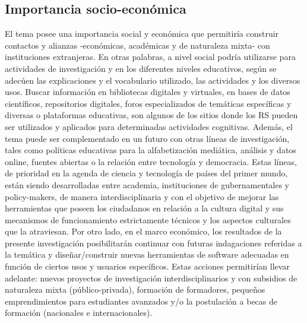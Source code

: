 \subsection{Importancia socio-económica}
\noindent El tema posee una importancia social y económica que permitiría construir contactos y alianzas -económicas, académicas y de naturaleza mixta- con instituciones extranjeras. En otras palabras, a nivel social podría utilizarse para actividades de investigación y en los diferentes niveles educativos, según se adecúen las explicaciones y el vocabulario utilizado, las actividades y los diversos usos. Buscar información en bibliotecas digitales y virtuales, en bases de datos científicos, repositorios digitales, foros especializados de temáticas específicas y diversas o plataformas educativas, son algunos de los sitios donde los RS pueden ser utilizados y aplicados para determinadas actividades cognitivas. Además, el tema puede ser complementado en un futuro con otras líneas de investigación, tales como políticas educativas para la alfabetización mediática, análisis y datos online, fuentes abiertas o la relación entre tecnología y democracia. Estas líneas, de prioridad en la agenda de ciencia y tecnología de países del primer mundo, están siendo desarrolladas entre academia, instituciones de gubernamentales y policy-makers, de manera interdisciplinaria y con el objetivo de mejorar las herramientas que poseen los ciudadanos en relación a la cultura digital y sus mecanismos de funcionamiento estrictamente técnicos y los aspectos culturales que la atraviesan.  
Por otro lado, en el marco económico, los resultados de la presente investigación posibilitarán continuar con futuras indagaciones referidas a la temática y diseñar/construir nuevas herramientas de software adecuadas en función de ciertos usos y usuarios específicos. Estas acciones permitirían llevar adelante: nuevos proyectos de investigación interdisciplinarios y con subsidios de naturaleza mixta (público-privada), formación de formadores, pequeños emprendimientos para estudiantes avanzados y/o la postulación a becas de formación (nacionales e internacionales).



